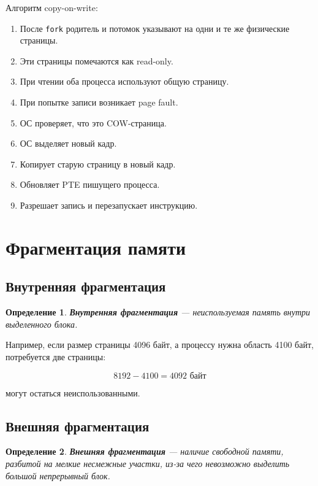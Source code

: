 \documentclass[a4paper,12pt]{article}
\newtheorem{definition}{Определение}
\begin{document}
Алгоритм copy-on-write:

\begin{enumerate}
    \item После \texttt{fork} родитель и потомок указывают на одни и те же физические страницы.
    \item Эти страницы помечаются как read-only.
    \item При чтении оба процесса используют общую страницу.
    \item При попытке записи возникает page fault.
    \item ОС проверяет, что это COW-страница.
    \item ОС выделяет новый кадр.
    \item Копирует старую страницу в новый кадр.
    \item Обновляет PTE пишущего процесса.
    \item Разрешает запись и перезапускает инструкцию.
\end{enumerate}

\section{Фрагментация памяти}

\subsection{Внутренняя фрагментация}

\begin{definition}
\textbf{Внутренняя фрагментация} --- неиспользуемая память внутри выделенного блока.
\end{definition}

Например, если размер страницы 4096 байт, а процессу нужна область 4100 байт, потребуется две страницы:

\[
8192 - 4100 = 4092 \text{ байт}
\]

могут остаться неиспользованными.

\subsection{Внешняя фрагментация}

\begin{definition}
\textbf{Внешняя фрагментация} --- наличие свободной памяти, разбитой на мелкие несмежные участки, из-за чего невозможно выделить большой непрерывный блок.
\end{definition}
\end{document}
